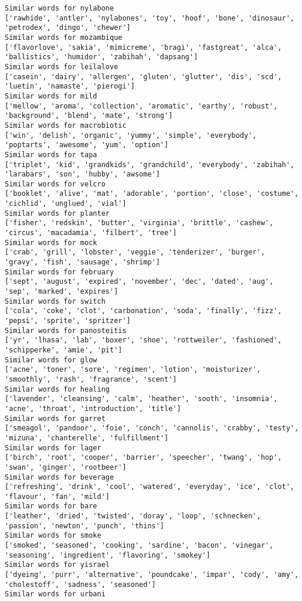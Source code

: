 \documentclass[11pt]{article}
\begin{document}
\begin{Verbatim}[commandchars=\\\{\}]
Similar words for nylabone
['rawhide', 'antler', 'nylabones', 'toy', 'hoof', 'bone', 'dinosaur', 'petrodex', 'dingo', 'chewer']
Similar words for mozambique
['flavorlove', 'sakia', 'mimicreme', 'bragi', 'fastgreat', 'alca', 'ballistics', 'humidor', 'zabihah', 'dapsang']
Similar words for leilalove
['casein', 'dairy', 'allergen', 'gluten', 'glutter', 'dis', 'scd', 'luetin', 'namaste', 'pierogi']
Similar words for mild
['mellow', 'aroma', 'collection', 'aromatic', 'earthy', 'robust', 'background', 'blend', 'mate', 'strong']
Similar words for macrobiotic
['win', 'delish', 'organic', 'yummy', 'simple', 'everybody', 'poptarts', 'awesome', 'yum', 'option']
Similar words for tapa
['triplet', 'kid', 'grandkids', 'grandchild', 'everybody', 'zabihah', 'larabars', 'son', 'hubby', 'awsome']
Similar words for velcro
['booklet', 'alive', 'mat', 'adorable', 'portion', 'close', 'costume', 'cichlid', 'unglued', 'vial']
Similar words for planter
['fisher', 'redskin', 'butter', 'virginia', 'brittle', 'cashew', 'circus', 'macadamia', 'filbert', 'tree']
Similar words for mock
['crab', 'grill', 'lobster', 'veggie', 'tenderizer', 'burger', 'gravy', 'fish', 'sausage', 'shrimp']
Similar words for february
['sept', 'august', 'expired', 'november', 'dec', 'dated', 'aug', 'sep', 'marked', 'expires']
Similar words for switch
['cola', 'coke', 'clot', 'carbonation', 'soda', 'finally', 'fizz', 'pepsi', 'sprite', 'spritzer']
Similar words for panosteitis
['yr', 'lhasa', 'lab', 'boxer', 'shoe', 'rottweiler', 'fashioned', 'schipperke', 'amie', 'pit']
Similar words for glow
['acne', 'toner', 'sore', 'regimen', 'lotion', 'moisturizer', 'smoothly', 'rash', 'fragrance', 'scent']
Similar words for healing
['lavender', 'cleansing', 'calm', 'heather', 'sooth', 'insomnia', 'acne', 'throat', 'introduction', 'title']
Similar words for garret
['smeagol', 'pandoor', 'foie', 'conch', 'cannolis', 'crabby', 'testy', 'mizuna', 'chanterelle', 'fulfillment']
Similar words for lager
['birch', 'root', 'cooper', 'barrier', 'speecher', 'twang', 'hop', 'swan', 'ginger', 'rootbeer']
Similar words for beverage
['refreshing', 'drink', 'cool', 'watered', 'everyday', 'ice', 'clot', 'flavour', 'fan', 'mild']
Similar words for bare
['leather', 'dried', 'twisted', 'doray', 'loop', 'schnecken', 'passion', 'newton', 'punch', 'thins']
Similar words for smoke
['smoked', 'seasoned', 'cooking', 'sardine', 'bacon', 'vinegar', 'seasoning', 'ingredient', 'flavoring', 'smokey']
Similar words for yisrael
['dyeing', 'purr', 'alternative', 'poundcake', 'impar', 'cody', 'amy', 'cholestoff', 'sadness', 'seasoned']
Similar words for urbani

\end{Verbatim}
\end{document}
